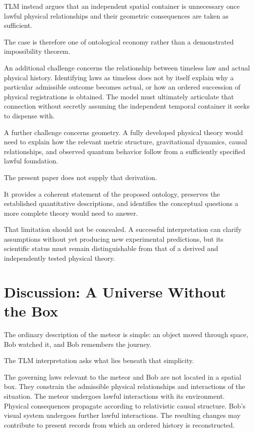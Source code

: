 \documentclass[12pt,onecolumn]{article}
\begin{document}
TLM instead argues that an independent spatial container is unnecessary once lawful physical relationships and their geometric consequences are taken as sufficient.

The case is therefore one of ontological economy rather than a demonstrated impossibility theorem.

An additional challenge concerns the relationship between timeless law and actual physical history. Identifying laws as timeless does not by itself explain why a particular admissible outcome becomes actual, or how an ordered succession of physical registrations is obtained. The model must ultimately articulate that connection without secretly assuming the independent temporal container it seeks to dispense with.

A further challenge concerns geometry. A fully developed physical theory would need to explain how the relevant metric structure, gravitational dynamics, causal relationships, and observed quantum behavior follow from a sufficiently specified lawful foundation.

The present paper does not supply that derivation.

It provides a coherent statement of the proposed ontology, preserves the established quantitative descriptions, and identifies the conceptual questions a more complete theory would need to answer.

That limitation should not be concealed. A successful interpretation can clarify assumptions without yet producing new experimental predictions, but its scientific status must remain distinguishable from that of a derived and independently tested physical theory.

\section{Discussion: A Universe Without the Box}

The ordinary description of the meteor is simple: an object moved through space, Bob watched it, and Bob remembers the journey.

The TLM interpretation asks what lies beneath that simplicity.

The governing laws relevant to the meteor and Bob are not located in a spatial box. They constrain the admissible physical relationships and interactions of the situation. The meteor undergoes lawful interactions with its environment. Physical consequences propagate according to relativistic causal structure. Bob's visual system undergoes further lawful interactions. The resulting changes may contribute to present records from which an ordered history is reconstructed.
\end{document}
